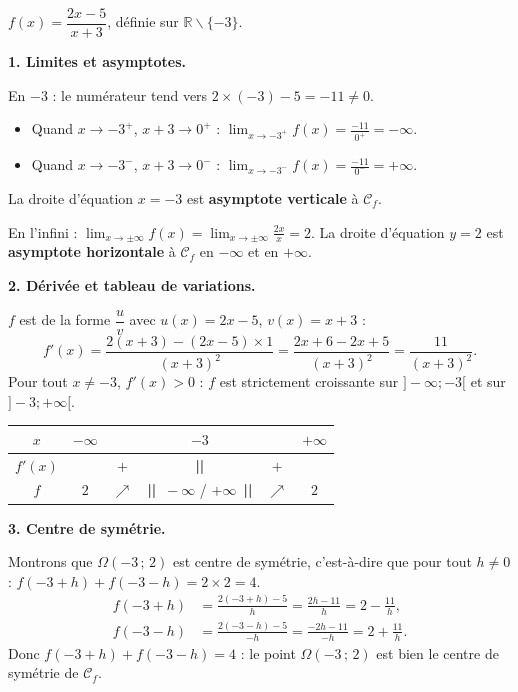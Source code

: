 \documentclass[11pt]{article}
\newcounter{popsec}
\newcounter{popsub}
\newcommand{\courssub}[1]{%
  \stepcounter{popsub}%
  \par\vspace{9pt}\noindent{\popxbold\fontsize{11.5}{13}\selectfont\color{popink}{\color{poporange}\thepopsec.\thepopsub}\hspace{6pt}#1}\par\nopagebreak\vspace{4pt}
}
\def\setminus{\mathbin{\backslash}}\let\smallsetminus\setminus
\begin{document}
\courssub{Je m'entraîne}

\begin{corrige}
$f(x)=\dfrac{2x-5}{x+3}$, définie sur $\mathbb{R}\setminus\{-3\}$.

\textbf{1. Limites et asymptotes.}

En $-3$ : le numérateur tend vers $2\times(-3)-5=-11\neq 0$.
\begin{itemize}
    \item Quand $x\to -3^+$, $x+3\to 0^+$ : $\displaystyle\lim_{x\to -3^+}f(x)=\frac{-11}{0^+}=-\infty$.
    \item Quand $x\to -3^-$, $x+3\to 0^-$ : $\displaystyle\lim_{x\to -3^-}f(x)=\frac{-11}{0^-}=+\infty$.
\end{itemize}
La droite d'équation $\boxed{x=-3}$ est \textbf{asymptote verticale} à $\mathcal{C}_f$.

En l'infini : $\displaystyle\lim_{x\to\pm\infty}f(x)=\lim_{x\to\pm\infty}\frac{2x}{x}=2$.
La droite d'équation $\boxed{y=2}$ est \textbf{asymptote horizontale} à $\mathcal{C}_f$ en $-\infty$ et en $+\infty$.

\textbf{2. Dérivée et tableau de variations.}

$f$ est de la forme $\dfrac{u}{v}$ avec $u(x)=2x-5$, $v(x)=x+3$ :
\[ f'(x) = \frac{2(x+3)-(2x-5)\times 1}{(x+3)^2} = \frac{2x+6-2x+5}{(x+3)^2} = \frac{11}{(x+3)^2}. \]
Pour tout $x\neq -3$, $f'(x)>0$ : $f$ est strictement croissante sur $]-\infty;-3[$ et sur $]-3;+\infty[$.

\begin{center}
\begin{tabular}{|c|ccccc|}\hline
$x$ & $-\infty$ & & $-3$ & & $+\infty$ \\ \hline
$f'(x)$ & & $+$ & \textbf{||} & $+$ & \\ \hline
$f$ & $2$ & $\nearrow$ & \textbf{||} $\ -\infty$ / $+\infty$\ \textbf{||} & $\nearrow$ & $2$ \\ \hline
\end{tabular}
\end{center}

\textbf{3. Centre de symétrie.}

Montrons que $\Omega(-3\,;\,2)$ est centre de symétrie, c'est-à-dire que pour tout $h\neq 0$ :
$f(-3+h)+f(-3-h)=2\times 2 = 4$.
\begin{align*}
f(-3+h) &= \frac{2(-3+h)-5}{h} = \frac{2h-11}{h} = 2-\frac{11}{h},\\
f(-3-h) &= \frac{2(-3-h)-5}{-h} = \frac{-2h-11}{-h} = 2+\frac{11}{h}.
\end{align*}
Donc $f(-3+h)+f(-3-h) = 4$ : le point $\boxed{\Omega(-3\,;\,2)}$ est bien le centre de symétrie de $\mathcal{C}_f$.


\end{corrige}
\end{document}

